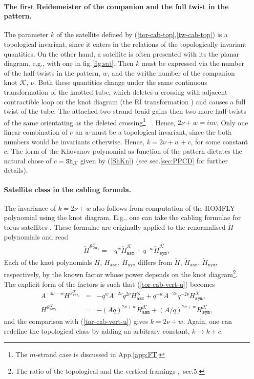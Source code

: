\documentclass[11pt]{article}
\def\be{\begin{eqnarray}}
\def\ee{\end{eqnarray}}
\def\nn{\nonumber}
\def\Km{\mathcal{K}}
\def\Sm{\mathcal{S}}
\def\Tor{\mathtt{Tor}}
\def\Sh{\mathtt{Sh}}
\def\sym{\mathtt{sym}}
\def\asm{\mathtt{asm}}
\begin{document}
\paragraph{The first Reidemeister of the companion and the full twist in the pattern.}
The parameter $k$ of the satellite defined by (\ref{tor-cab-top},\ref{tw-cab-top}) is a topological invariant, since it enters in the relations of the topologically invariant quantities. On the other hand, a satellite is often presented with its the planar diagram, e.g., with one in fig.\ref{fig:sat}. Then $k$ must be expressed via the number of the half-twists in the pattern, $w$, and the writhe number of the companion knot $\Km$, $\nu$. Both these quantities change under the same continuous transformation of the knotted tube, which deletes a crossing with adjacent contractible loop on the knot diagram (the RI transformation \cite{KnotBook}) and causes a full twist of the tube. The attached two-strand braid gains then two more half-twists of the same orientating as the deleted crossing\footnote{The $m$-strand case is discussed in App.\ref{app:FT}} ~\cite{KnotBook}.
Hence, $2\nu+w=inv$. Only one linear combination of $\nu$ an $w$ must be a topological invariant, since the both numbers would be invariants otherwise. Hence, $k=2\nu+w+c$, for some constant $c$.  The form of the Khovanov polynomial as function of the pattern dictates the natural chose of $c=\Sh_{\Km}$ given by (\ref{ShKn}) (see sec.\ref{sec:PPCD} for further details). 

\paragraph{Satellite class in the cabling formula.}
The invariance of $k=2\nu+w$ also follows from computation of the HOMFLY polynomial using the knot diagram. E.g., one can take the cabling formulae for torus satellites \cite{AMcab}. These formulae are originally applied to the renormalised $\check{H}$ polynomials and read 
\be
\check{H}^{\Sm_{\Tor_k}^{\Km}}=-q^{w}\check{H}^{\Km}_{\asm}+q^{-w}\check{H}^{\Km}_{\sym},\label{tor-cab-vert-u}
\ee
Each of the knot polynomials $H$, $H_{\asm}$, $H_{\sym}$ differs from $\check{H}$, $\check{H}_{\asm}$, $\check{H}_{\sym}$, respectively, by the known factor whose power depends on the knot diagram\footnote{The ratio of the topological and the vertical framings \cite{AMcab},~sec.5.}. The explicit form of the factors is such that (\ref{tor-cab-vert-u}) becomes 
\be
A^{-4\nu-w}H^{\Sm_{\Tor_k}^{\Km}}&=&-q^{w}A^{-2\nu}q^{2\nu}H^{\Km}_{\asm}+q^{-w}A^{-2\nu}q^{-2\nu}H^{\Km}_{\sym},\nn\\
H^{\Sm_{\Tor_k}^{\Km}}&=&-(Aq)^{2\nu+w}H^{\Km}_{\asm}+(A/q)^{2\nu+w}H^{\Km}_{\sym},
\label{tor-cab-top-u}\ee
and the comparison with (\ref{tor-cab-vert-u}) gives $k=2\nu+w$. Again, one can redefine the topological class by adding an arbitrary constant, $k\to k+c$.
\end{document}
